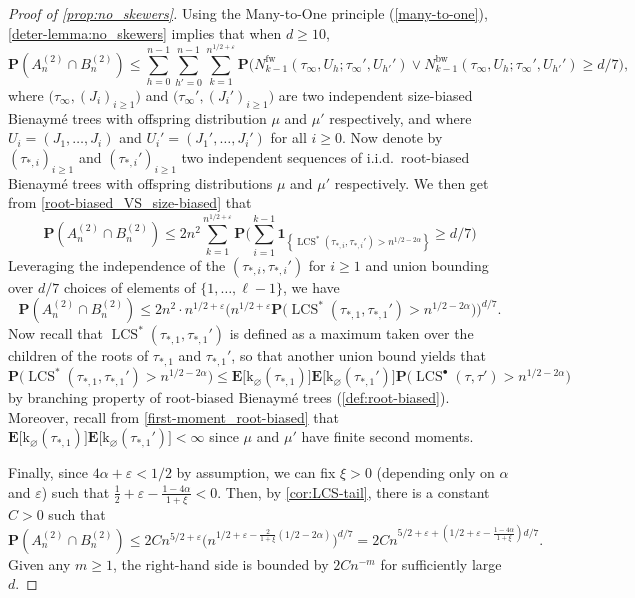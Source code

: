 \documentclass[11pt,reqno]{amsart}
\renewcommand{\P}{\mathbf{P}}
\newcommand{\1}{\mathbf{1}}
\newcommand{\0}{\mathbf{0}}
\newcommand{\e}{\varepsilon}
\newcommand{\E}{{\mathbf E}}
\newcommand{\I}[1]{{\mathbf 1}_{\left\{#1\right\}}}
\newcommand{\prob}{\mathbf{P}}
\newcommand{\rk}{\mathrm{k}}
\newcommand{\LCS}{\operatorname{LCS}}
\newcommand{\fw}{\mathrm{fw}}
\newcommand{\bw}{\mathrm{bw}}
\begin{document}
\begin{proof}[Proof of \cref{prop:no_skewers}]
Using the Many-to-One principle (\cref{many-to-one}), \cref{deter-lemma:no_skewers} implies that when $d\geq 10$,
\[
\prob(A_n^{(2)}\cap B_n^{(2)}) \leq \sum_{h=0}^{n-1}\sum_{h'=0}^{n-1}\sum_{k=1}^{n^{1/2+\varepsilon}} \P\big(N_{k-1}^{\fw}(\tau_\infty,U_h; \tau_\infty', U_{h'}') \vee N_{k-1}^{\bw}(\tau_\infty,U_h; \tau_\infty', U_{h'}')\geq d/7 \big),
\]
where $\big(\tau_\infty,(J_i)_{i\geq 1}\big)$ and $\big(\tau_\infty',(J_i')_{i\geq 1}\big)$ are two independent size-biased Bienaym\'{e} trees with offspring distribution $\mu$ and $\mu'$ respectively, and where $U_i = (J_1,\ldots,J_i)$ and $U_i' = (J_1',\ldots,J_i')$ for all $i\geq 0$. Now denote by $(\tau_{*,i})_{i\geq 1}$ and $(\tau_{*,i}')_{i\geq 1}$ two independent sequences of i.i.d.~root-biased Bienaymé trees with offspring distributions $\mu$ and $\mu'$ respectively. We then get from \cref{root-biased_VS_size-biased} that
\[\prob(A_n^{(2)}\cap B_n^{(2)}) \leq 2n^2\sum_{k=1}^{n^{1/2+\varepsilon}}\P\bigg(\sum_{i=1}^{k-1} \I{\LCS^*(\tau_{*,i},\tau_{*,i}')>n^{1/2-2\alpha}}\geq d/7\bigg) \]
Leveraging the independence of the $(\tau_{*,i},\tau_{*,i}')$ for $i\geq 1$ and union bounding over $d/7$ choices of elements of $\{1,\ldots,\ell-1\}$, we have
\[\prob(A_n^{(2)}\cap B_n^{(2)}) \leq 2n^2 \cdot n^{1/2+\varepsilon} \Big(n^{1/2+\varepsilon}\P\big(\LCS^*(\tau_{*,1},\tau_{*,1}')>n^{1/2-2\alpha}\big)\Big)^{d/7}.\]
Now recall that $\LCS^*(\tau_{*,1},\tau_{*,1}')$ is defined as a maximum taken over the children of the roots of $\tau_{*,1}$ and $\tau_{*,1}'$, so that another union bound yields that
\[\P\big(\LCS^*(\tau_{*,1},\tau_{*,1}')>n^{1/2-2\alpha}\big)\leq \E\big[\rk_\varnothing(\tau_{*,1})\big]\E\big[\rk_\varnothing(\tau_{*,1}')\big]\P\big(\LCS^\bullet(\tau,\tau')>n^{1/2-2\alpha}\big)\]
by branching property of root-biased Bienaymé trees (\cref{def:root-biased}). Moreover, recall from \eqref{first-moment_root-biased} that $\E\big[\rk_\varnothing(\tau_{*,1})\big]\E\big[\rk_\varnothing(\tau_{*,1}')\big]<\infty$ since $\mu$ and $\mu'$ have finite second moments.

Finally, since $4\alpha+\varepsilon<1/2$ by assumption, we can fix $\xi>0$ (depending only on $\alpha$ and $\varepsilon$) such that $\tfrac{1}{2}+\varepsilon-\tfrac{1-4\alpha}{1+\xi}<0$. Then, by \cref{cor:LCS-tail}, there is a constant $C > 0$ such that 
\[
\prob(A_n^{(2)} \cap B_n^{(2)}) \leq 2C n^{5/2+\e} \Big(n^{1/2+\varepsilon-\frac{2}{1+\xi}(1/2-2\alpha)} \Big)^{d/7} = 2C n^{5/2+\e + \left(1/2+\e -\frac{1-4\alpha}{1+\xi}\right)d/7}.
\]
Given any $m\geq 1$, the right-hand side is bounded by $2Cn^{-m}$ for sufficiently large $d$.
\end{proof}
\end{document}
